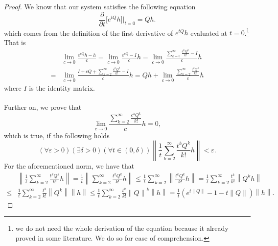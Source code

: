 \documentclass{article}
\newcommand{\norm}[1]{\left\lVert #1 \right\rVert}
\newcommand{\de}{\delta}
\newcommand{\ve}{\varepsilon}
\begin{document}
\begin{proof}
We know that our system satisfies the following equation
\begin{equation} \label{eq:kol_forw}
\frac{\partial}{\partial t}\bigl[e^{tQ}h\bigr]\Big\vert_{t=0}=Q h.
\end{equation}
which comes from the definition of the first derivative of $e^{t Q}h$ evaluated at $t=0$.\footnote{we do not need the whole derivation of the equation because it already proved in some literature. We do so for ease of comprehension.}
That is 
\begin{equation*}
\begin{split}
&\lim_{c\to0}{\frac{e^{c Q}h-h}{c}}=\lim_{c\to0}{\frac{e^{c Q}-I}{c}h}=\lim_{c\to0}{\frac{\sum_{k=0}^{\infty}{\frac{c^{k}Q^{k}}{k!}}-I}{c}h}\\
=&\lim_{c\to0}{\frac{I+c Q+\sum_{k=2}^{\infty}{\frac{c^{k}Q^{k}}{k!}}-I}{c}h}=Q h+\lim_{c\to0}{\frac{\sum_{k=2}^{\infty}{\frac{c^{k}Q^{k}}{k!}}}{c}h}
\end{split}
\end{equation*}
where $I$ is the identity matrix.\\\\
Further on, we prove that 
\begin{equation*}
\lim_{c\to0}{\frac{\sum_{k=2}^{\infty}{\frac{c^{k}Q^{k}}{k!}}}{c}h}=0,
\end{equation*}
which is true, if the following holds
\begin{equation*}
(\forall\ve>0)(\exists \de>0)(\forall t \in(0,\de))\norm{\frac{1}{t}\sum_{k=2}^{\infty}{\frac{t^{k}Q^{k}}{k!}}h}<\ve.
\end{equation*}
For the aforementioned norm, we have that
\begin{equation*}
\begin{split}
&\norm{\frac{1}{t}\sum_{k=2}^{\infty}{\frac{t^{k}Q^{k}}{k!}}h}=\frac{1}{t}\norm{\sum_{k=2}^{\infty}{\frac{t^{k}Q^{k}}{k!}}h}\leq\frac{1}{t}\sum_{k=2}^{\infty}{\norm{\frac{t^{k}Q^{k}}{k!}h}}=\frac{1}{t}\sum_{k=2}^{\infty}{\frac{t^{k}}{k!}\norm{Q^{k}h}}\\
\leq&\frac{1}{t}\sum_{k=2}^{\infty}{\frac{t^{k}}{k!}\norm{Q^{k}}\norm{h}}\leq\frac{1}{t}\sum_{k=2}^{\infty}{\frac{t^{k}}{k!}\norm{Q}^{k}\norm{h}}=\frac{1}{t}(e^{t\norm{Q}}-1-t\norm{Q})\norm{h}.
\end{split}

\end{equation*}
\end{proof}
\end{document}
